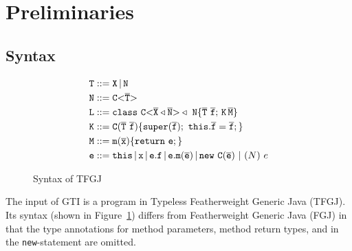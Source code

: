 \section{Preliminaries}
\label{sec:preliminaries}
\subsection{Syntax}
\begin{figure}[tp]
\begin{align*}
  {\tt T} &::= {\tt X} \, | \, {\tt N} \\
  {\tt N} &::= \mathtt{C {\tt <} \overline{\tt T} {\tt >} }\\
  {\tt L} &::= \mathtt{class} \ \mathtt{C {\tt <} \overline{\tt X} \triangleleft \overline{\tt N} {\tt >} }
             \triangleleft \ {\tt N} \{ \overline{\tt T} \ \overline{\tt f}; \,{\tt K} \, \overline{\tt M} \} \\
  {\tt K} &::= {\tt C}(\overline{\tt T} \ \overline{\tt f})\{\mathtt{super}(\overline{\tt f}); \ \mathtt{this}.\overline{\tt f}=\overline{\tt f};\} \\
  {\tt M} &::= \mathtt{m}(\overline{\tt x})\{ \mathtt{ return}\ {\tt e}; \} \\
  {\tt e} &::= \mathtt{this} \, | \, {\tt x} \, | \, {\tt e}.{\tt f} \, | \,
             {\tt e}.\mathtt{m}(\overline{\tt e}) \, | \, \mathtt{new}\ \mathtt{C}(\overline{\tt e})
             \ |\ (N)\ e
\end{align*}
  \caption{Syntax of TFGJ}
  \label{fig:syntax-tfgj}
\end{figure}
The input of GTI is a program in Typeless Featherweight Generic Java (TFGJ). Its syntax
(shown in Figure~\ref{fig:syntax-tfgj}) differs
from Featherweight Generic Java (FGJ) in that 
the type annotations for method parameters, method return types, and in the \texttt{new}-statement are
omitted.%


